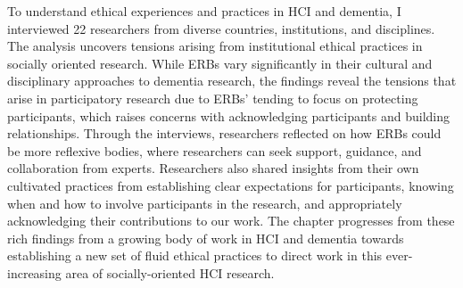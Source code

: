 To understand ethical experiences and practices in HCI and dementia, I interviewed 22 researchers from diverse countries, institutions, and disciplines. The analysis uncovers tensions arising from institutional ethical practices in socially oriented research. While ERBs vary significantly in their cultural and disciplinary approaches to dementia research, the findings reveal the tensions that arise in participatory research due to ERBs’ tending to focus on protecting participants, which raises concerns with acknowledging participants and building relationships. Through the interviews, researchers reflected on how ERBs could be more reflexive bodies, where researchers can seek support, guidance, and collaboration from experts. Researchers also shared insights from their own cultivated practices from establishing clear expectations for participants, knowing when and how to involve participants in the research, and appropriately acknowledging their contributions to our work. The chapter progresses from these rich findings from a growing body of work in HCI and dementia towards establishing a new set of fluid ethical practices to direct work in this ever-increasing area of socially-oriented HCI research. 



